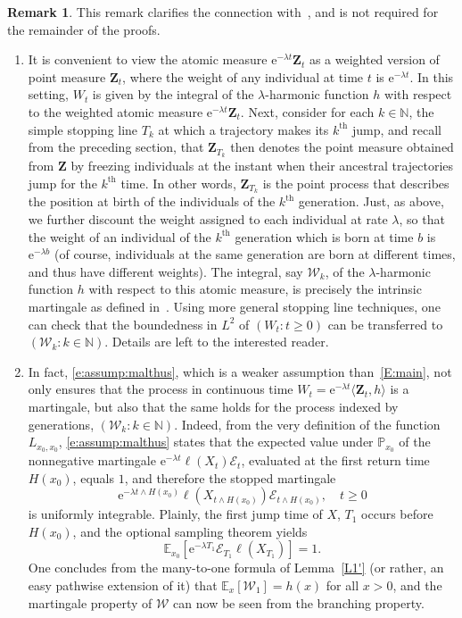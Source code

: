 \documentclass[11pt]{article}
\theoremstyle{definition}
\newtheorem{rema}[theo]{Remark}
\numberwithin{equation}{section}
\numberwithin{figure}{section}
\numberwithin{table}{section}
\newcommand\Zz{\mathbf{Z}}
\newcommand\PP{\mathbb{P}}
\newcommand\EE{\mathbb{E}}
\newcommand\NN{\mathbb{N}}
\newcommand\Ee{\mathcal{E}}
\newcommand\e{\mathrm{e}}
\newcommand{\crochet}[1]{{\langle #1 \rangle}}
\begin{document}
\goodbreak
\begin{rema}
This remark clarifies the connection with~\cite{Jagers}, and is not required for the remainder of the proofs.
\begin{enumerate}
\item \label{list4.3.1}It is convenient to view the atomic measure $\e^{-\lambda t} \Zz_t$ as a weighted version of point measure $\Zz_t$, where the weight of any individual at time $t$ is $\e^{-\lambda t}$. In this setting, $W_t$ is given by the integral of the $\lambda$-harmonic function $h$ with respect to the weighted atomic measure $\e^{-\lambda t} \Zz_t$. Next, consider for each $k\in \NN$, the simple stopping line $T_k$ at which a trajectory makes its $k^{\text {th}}$ jump, and recall from the preceding section, that $\Zz_{T_k}$ then denotes the point measure obtained from $\Zz$ by freezing individuals at the instant when their ancestral trajectories jump for the $k^{\text{th}}$ time. In other words, $\Zz_{T_k}$ is the point process that describes the position at birth of the individuals of the $k^{\text{th}}$ generation. Just, as above, we further discount the weight assigned to each individual at rate $\lambda$, so that the weight of an individual of the $k^{\text{th}}$ generation which is born at time $b$ is $\e^{-\lambda b}$ (of course, individuals at the same generation are born at different times, and thus have different weights). The integral, say ${\mathcal W}_k$, of the $\lambda$-harmonic function $h$ with respect to this atomic measure, is precisely the intrinsic martingale as defined in~\cite{Jagers}. Using more general stopping line techniques, one can check that the boundedness in $L^2$ of $(W_t: t\geq 0)$ can be transferred to $({\mathcal W}_k: k\in\NN)$. Details are left to the interested reader.

\item \label{list4.3.2}In fact, \eqref{e:assump:malthus}, which is a weaker assumption than~\eqref{E:main}, not only ensures that the process in continuous time $W_t=\e^{-\lambda t} \crochet{\Zz_t, h}$ is a martingale, but also that the same holds for the process indexed by generations, $({\mathcal W}_k: k\in\NN)$. Indeed, from the very definition of the function $L_{x_0,x_0}$, \eqref{e:assump:malthus} states that the expected value under $\PP_{x_0}$ of the nonnegative martingale $\e^{-\lambda t} \ell(X_t) \Ee_t$, evaluated at the first return time $H(x_0)$, equals $1$, and therefore the stopped martingale
\[
\e^{-\lambda t\wedge H(x_0)} \ell(X_{t\wedge H(x_0)}) \Ee_{t\wedge H(x_0)}, \quad t\geq 0
\]
is uniformly integrable. Plainly, the first jump time of $X$, $T_1$ occurs before $H(x_0)$, and the optional sampling theorem yields
\[
\EE_{x_0}[\e^{-\lambda T_1} \Ee_{T_1} \ell(X_{T_1})]=1.
\]
One concludes from the many-to-one formula of Lemma~\ref{L1'} (or rather, an easy pathwise extension of it) that $\EE_{x}[{\mathcal W}_1]=h(x)$ for all $x>0$, and the martingale property of ${\mathcal W}$ can now be seen from the branching property.
\end{enumerate}
\end{rema}
\end{document}
